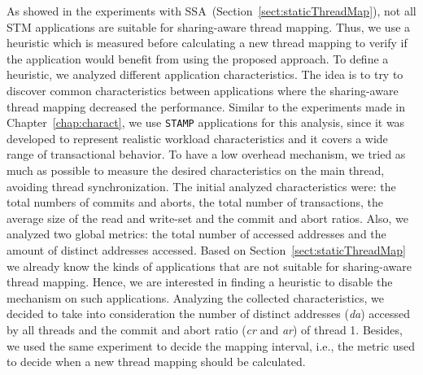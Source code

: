 As showed in the experiments with SSA~(Section~\ref{sect:staticThreadMap}), not all STM applications are suitable for sharing-aware thread mapping. Thus, we use a heuristic which is measured before calculating a new thread mapping to verify if the application would benefit from using the proposed approach. To define a heuristic, we analyzed different application characteristics. The idea is to try to discover common characteristics between applications where the sharing-aware thread mapping decreased the performance. Similar to the experiments made in Chapter~\ref{chap:charact}, we use \texttt{STAMP} applications for this analysis, since it was developed to represent realistic workload characteristics and it covers a wide range of transactional behavior. To have a low overhead mechanism, we tried as much as possible to measure the desired characteristics on the main thread, avoiding thread synchronization. The initial analyzed characteristics were: the total numbers of commits and aborts, the total number of transactions, the average size of the read and write-set and the commit and abort ratios. Also, we analyzed two global metrics: the total number of accessed addresses and the amount of distinct addresses accessed. Based on Section~\ref{sect:staticThreadMap} we already know the kinds of applications that are not suitable for sharing-aware thread mapping. Hence, we are interested in finding a heuristic to disable the mechanism on such applications. Analyzing the collected characteristics, we decided to take into consideration the number of distinct addresses (\textit{da}) accessed by all threads and the commit and abort ratio (\textit{cr} and \textit{ar}) of thread 1. Besides, we used the same experiment to decide the mapping interval, i.e., the metric used to decide when a new thread mapping should be calculated.
